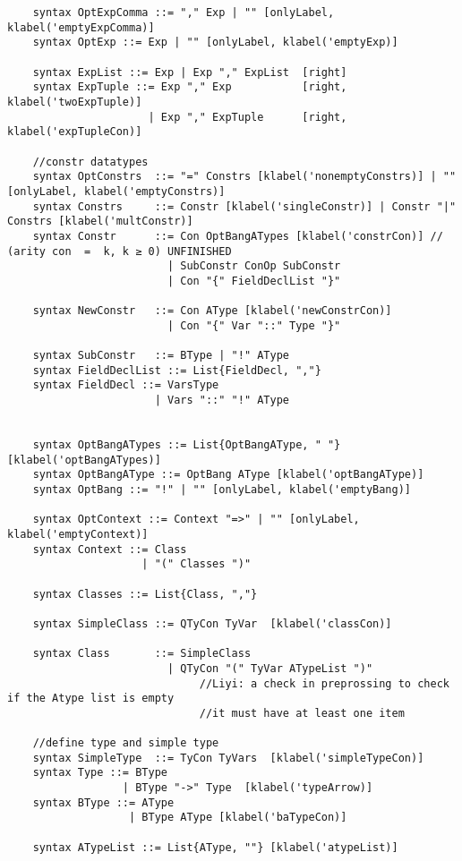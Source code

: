 \begin{lstlisting}
    syntax OptExpComma ::= "," Exp | "" [onlyLabel, klabel('emptyExpComma)]
    syntax OptExp ::= Exp | "" [onlyLabel, klabel('emptyExp)]

    syntax ExpList ::= Exp | Exp "," ExpList  [right]
    syntax ExpTuple ::= Exp "," Exp           [right, klabel('twoExpTuple)]
                      | Exp "," ExpTuple      [right, klabel('expTupleCon)]

    //constr datatypes
    syntax OptConstrs  ::= "=" Constrs [klabel('nonemptyConstrs)] | "" [onlyLabel, klabel('emptyConstrs)]
    syntax Constrs     ::= Constr [klabel('singleConstr)] | Constr "|" Constrs [klabel('multConstr)]
    syntax Constr      ::= Con OptBangATypes [klabel('constrCon)] // (arity con  =  k, k ≥ 0) UNFINISHED
                         | SubConstr ConOp SubConstr
                         | Con "{" FieldDeclList "}"

    syntax NewConstr   ::= Con AType [klabel('newConstrCon)]
                         | Con "{" Var "::" Type "}"

    syntax SubConstr   ::= BType | "!" AType
    syntax FieldDeclList ::= List{FieldDecl, ","}
    syntax FieldDecl ::= VarsType
                       | Vars "::" "!" AType


    syntax OptBangATypes ::= List{OptBangAType, " "} [klabel('optBangATypes)]
    syntax OptBangAType ::= OptBang AType [klabel('optBangAType)]
    syntax OptBang ::= "!" | "" [onlyLabel, klabel('emptyBang)]

    syntax OptContext ::= Context "=>" | "" [onlyLabel, klabel('emptyContext)]
    syntax Context ::= Class
                     | "(" Classes ")"

    syntax Classes ::= List{Class, ","}

    syntax SimpleClass ::= QTyCon TyVar  [klabel('classCon)]

    syntax Class       ::= SimpleClass
                         | QTyCon "(" TyVar ATypeList ")"
                              //Liyi: a check in preprossing to check if the Atype list is empty
                              //it must have at least one item

    //define type and simple type
    syntax SimpleType  ::= TyCon TyVars  [klabel('simpleTypeCon)]
    syntax Type ::= BType
                  | BType "->" Type  [klabel('typeArrow)]
    syntax BType ::= AType
                   | BType AType [klabel('baTypeCon)]

    syntax ATypeList ::= List{AType, ""} [klabel('atypeList)]


\end{lstlisting}
